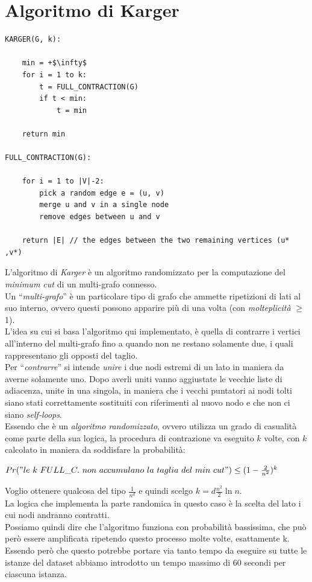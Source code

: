 \section{Algoritmo di Karger}\label{karger}
\begin{lstlisting}[mathescape=true]
KARGER(G, k):

	min = +$\infty$
	for i = 1 to k:		
		t = FULL_CONTRACTION(G)		
		if t < min:
			t = min
			
	return min

FULL_CONTRACTION(G):

	for i = 1 to |V|-2:
		pick a random edge e = (u, v)
		merge u and v in a single node
		remove edges between u and v
		
	return |E| // the edges between the two remaining vertices (u* ,v*)
\end{lstlisting}	

L'algoritmo di \textit{Karger} è un algoritmo randomizzato per la computazione del \textit{minimum cut} di un multi-grafo connesso.\\
Un ``\textit{multi-grafo}'' è un particolare tipo di grafo che ammette ripetizioni di lati al suo interno, ovvero questi possono apparire più di una volta (con \textit{molteplicità} $\geq$ 1).\\
L'idea su cui si basa l'algoritmo qui implementato, è quella di contrarre i vertici all'interno del multi-grafo fino a quando non ne restano solamente due, i quali rappresentano gli opposti del taglio.\\
Per ``\textit{contrarre}'' si intende \textit{unire} i due nodi estremi di un lato in maniera da averne solamente uno. 
Dopo averli uniti vanno aggiustate le vecchie liste di adiacenza, unite in una singola, in maniera che i vecchi puntatori ai nodi tolti siano stati correttamente sostituiti con riferimenti al nuovo nodo e che non ci siano \textit{self-loops}.\\
Essendo che è un \textit{algoritmo randomizzato}, ovvero utilizza un grado di casualità come parte della sua logica, la procedura di contrazione va eseguito $k$ volte, con $k$ calcolato in maniera da soddisfare la probabilità:
\begin{center}
	$Pr("le~k~FULL\_C.~non~accumulano~la~taglia~del~min~cut") \leq (1-\frac{2}{n^2})^k$

\end{center}
Voglio ottenere qualcosa del tipo $\frac{1}{n^d}$ e quindi scelgo $k = d\frac{n^2}{2}\ln n$.\\
La logica che implementa la parte randomica in questo caso è la scelta del lato i cui nodi andranno contratti.\\
Possiamo quindi dire che l'algoritmo funziona con probabilità bassissima, che può però essere amplificata ripetendo questo processo molte volte, esattamente k.\\
Essendo però che questo potrebbe portare via tanto tempo da eseguire su tutte le istanze del dataset abbiamo introdotto un tempo massimo di 60 secondi per ciascuna istanza.

